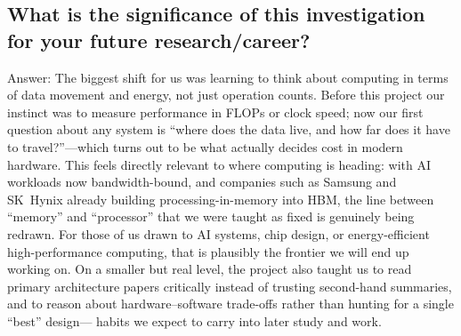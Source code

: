 \documentclass{article} %
\begin{document}
\subsection*{What is the significance of this investigation for your future research/career?}
Answer: The biggest shift for us was learning to think about computing in terms
of data movement and energy, not just operation counts. Before this project our
instinct was to measure performance in FLOPs or clock speed; now our first
question about any system is ``where does the data live, and how far does it have
to travel?''---which turns out to be what actually decides cost in modern
hardware. This feels directly relevant to where computing is heading: with AI
workloads now bandwidth-bound, and companies such as Samsung and SK~Hynix
already building processing-in-memory into HBM, the line between ``memory'' and
``processor'' that we were taught as fixed is genuinely being redrawn. For those
of us drawn to AI systems, chip design, or energy-efficient high-performance
computing, that is plausibly the frontier we will end up working on. On a smaller
but real level, the project also taught us to read primary architecture papers
critically instead of trusting second-hand summaries, and to reason about
hardware--software trade-offs rather than hunting for a single ``best'' design---
habits we expect to carry into later study and work.
\end{document}
